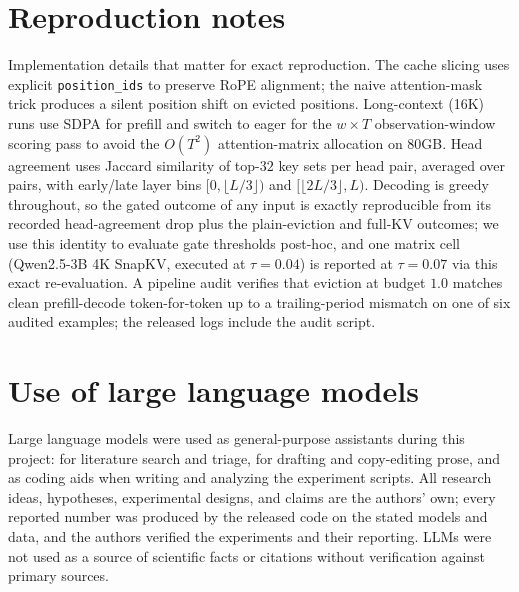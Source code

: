 \documentclass{article}
\begin{document}
\section{Reproduction notes}
\label{app:repro}
Implementation details that matter for exact reproduction. The cache
slicing uses explicit \texttt{position\_ids} to preserve RoPE alignment;
the naive attention-mask trick produces a silent position shift on
evicted positions. Long-context (16K) runs use SDPA for prefill and
switch to eager for the $w \times T$ observation-window scoring pass to
avoid the $O(T^2)$ attention-matrix allocation on 80GB. Head agreement
uses Jaccard similarity of top-$32$ key sets per head pair, averaged
over pairs, with early/late layer bins $[0, \lfloor L/3 \rfloor)$ and
$[\lfloor 2L/3 \rfloor, L)$. Decoding is greedy throughout, so the
gated outcome of any input is exactly reproducible from its recorded
head-agreement drop plus the plain-eviction and full-KV outcomes; we
use this identity to evaluate gate thresholds post-hoc, and one matrix
cell (Qwen2.5-3B 4K SnapKV, executed at $\tau = 0.04$) is reported at
$\tau = 0.07$ via this exact re-evaluation. A pipeline audit verifies
that eviction at budget $1.0$ matches clean prefill-decode
token-for-token up to a trailing-period mismatch on one of six audited
examples; the released logs include the audit script.



\section{Use of large language models}
\label{app:llm}
Large language models were used as general-purpose assistants during this
project: for literature search and triage, for drafting and copy-editing prose,
and as coding aids when writing and analyzing the experiment scripts. All
research ideas, hypotheses, experimental designs, and claims are the authors'
own; every reported number was produced by the released code on the stated
models and data, and the authors verified the experiments and their reporting.
LLMs were not used as a source of scientific facts or citations without
verification against primary sources.
\end{document}
